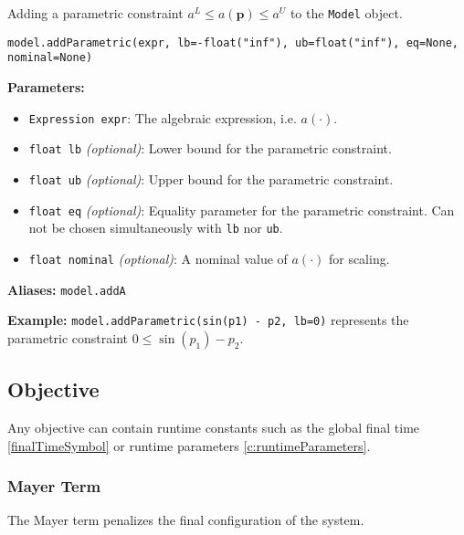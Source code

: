 \documentclass[12pt]{article}
\renewcommand{\v}{\bm}
\begin{document}
\begin{mdframed}[backgroundcolor=gray!10, roundcorner=10pt,
		linewidth=1pt]

	Adding a parametric constraint ${a}^{L} \leq {a}(\v{p}) \leq
		{a}^{U}$ to the \texttt{Model} object.

	\begin{lstlisting}
model.addParametric(expr, lb=-float("inf"), ub=float("inf"), eq=None, nominal=None)
		\end{lstlisting}
	\label{addParametric}
	\textbf{Parameters:}
	\begin{itemize}
		\item \texttt{Expression expr}: The algebraic
		      expression, i.e. $a(\cdot)$.
		\item \texttt{float lb} \emph{(optional)}: Lower bound
		      for the parametric constraint.
		\item \texttt{float ub} \emph{(optional)}: Upper bound
		      for the parametric constraint.
		\item \texttt{float eq} \emph{(optional)}: Equality
		      parameter for the parametric constraint. Can not be
		      chosen simultaneously with
		      \texttt{lb} nor \texttt{ub}.
		\item \texttt{float nominal} \emph{(optional)}: A
		      nominal value of $a(\cdot)$ for scaling.
	\end{itemize}

	\textbf{Aliases:}  \texttt{model.addA}

	\textbf{Example:} \texttt{model.addParametric(sin(p1) -
		p2, lb=0)} represents the parametric constraint
	$0 \leq \sin(p_1) - p_2$.
\end{mdframed}

\subsection{Objective}

Any objective can contain runtime constants such as the global
final time \eqref{finalTimeSymbol} or runtime parameters
\eqref{c:runtimeParameters}.

\subsubsection{Mayer Term}

The Mayer term penalizes the final configuration of the system.
\end{document}
